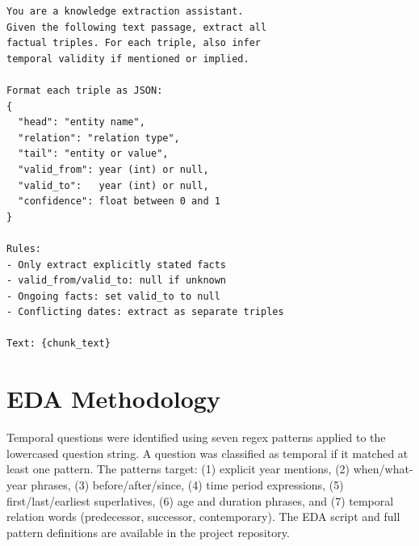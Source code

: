 \documentclass[11pt]{article}
\begin{document}
\begin{verbatim}
You are a knowledge extraction assistant.
Given the following text passage, extract all
factual triples. For each triple, also infer
temporal validity if mentioned or implied.

Format each triple as JSON:
{
  "head": "entity name",
  "relation": "relation type",
  "tail": "entity or value",
  "valid_from": year (int) or null,
  "valid_to":   year (int) or null,
  "confidence": float between 0 and 1
}

Rules:
- Only extract explicitly stated facts
- valid_from/valid_to: null if unknown
- Ongoing facts: set valid_to to null
- Conflicting dates: extract as separate triples

Text: {chunk_text}
\end{verbatim}

\section{EDA Methodology}
\label{app:eda}

Temporal questions were identified using seven regex patterns applied
to the lowercased question string. A question was classified as temporal
if it matched at least one pattern. The patterns target:
(1) explicit year mentions,
(2) when/what-year phrases,
(3) before/after/since,
(4) time period expressions,
(5) first/last/earliest superlatives,
(6) age and duration phrases, and
(7) temporal relation words (predecessor, successor, contemporary).
The EDA script and full pattern definitions are available in the
project repository.
\end{document}
